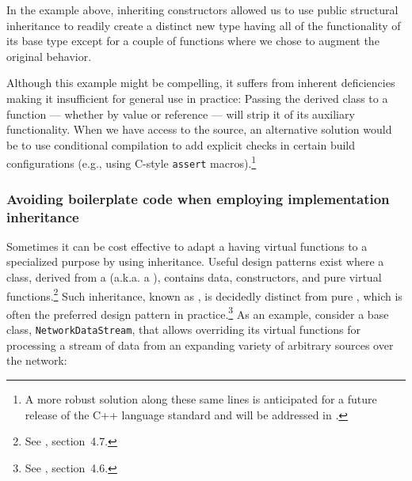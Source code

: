 \noindent In the example above, inheriting constructors allowed us to use public
structural inheritance to readily create a distinct new type having
all of the functionality of its base type except for a couple of
functions where we chose to augment the original behavior.

Although this example might be compelling, it suffers from inherent deficiencies making it insufficient for general use in practice: Passing the derived class to a function --- whether by value or reference --- will
strip it of its auxiliary functionality. When we have access to the source, an alternative solution would be to use conditional compilation to add explicit checks in certain build configurations (e.g., using C-style \lstinline!assert! macros).{\cprotect\footnote{A more robust solution along these same lines is anticipated for a future release of the C++ language standard and will be addressed in \cite{lakos23}.}}

\subsubsection[Avoiding boilerplate code when employing implementation inheritance]{Avoiding boilerplate code when employing implementation inheritance}\label{avoiding-boilerplate-code-when-employing-implementation-inheritance}

Sometimes it can be cost effective to adapt a 
having virtual functions to a specialized purpose
by using inheritance. Useful design patterns
exist where a  class, derived from a
 (a.k.a. a ), contains data,
constructors, and pure virtual functions.\footnote{See
  \cite{lakos2a}, section~4.7.} Such inheritance, known as
, is decidedly distinct from pure , which is often the preferred design
  pattern in practice.\footnote{See \cite{lakos2b}, section~4.6.} As an example, consider a base class,
\lstinline!NetworkDataStream!, that allows overriding its virtual functions
for processing a stream of data from an expanding variety of arbitrary
sources over the network:

